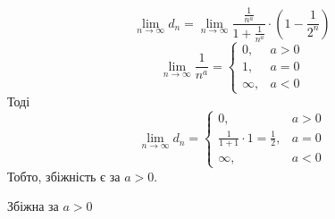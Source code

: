 \documentclass[11pt, a4paper]{article} %
\begin{document}
\begin{enumerate}
    \[\lim_{n\to\infty} d_n = \lim_{n\to\infty} \frac{\frac{1}{n^a}}{1+\frac{1}{n^a}} \cdot \left(1-\frac{1}{2^n}\right) \]
    \[\lim_{n\to\infty} \frac{1}{n^a} = \begin{cases}
        0, & a>0\\
        1, & a=0\\
        \infty, & a<0
    \end{cases}\]
    Тоді
    \[\lim_{n\to\infty} d_n = \begin{cases}
        0, & a>0\\
        \frac{1}{1+1} \cdot 1 = \frac{1}{2}, & a=0\\
        \infty, & a<0
    \end{cases}\]
    Тобто, збіжність є за $a > 0$.

    \begin{mdframed}[backgroundcolor=yellow!20]
    Збіжна за $a > 0$
    \end{mdframed}
\end{enumerate}
\end{document}
